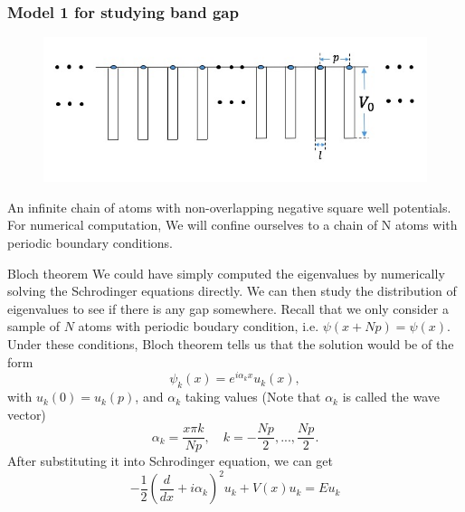 \documentclass{beamer}
\begin{document}

\begin{frame}
\frametitle{Model 1 for studying band gap}
\begin{figure}
\includegraphics[width=0.8\linewidth]{kp_bandgap.jpeg}
\end{figure}
An infinite chain of atoms with non-overlapping negative square well potentials. For numerical computation, We will confine ourselves to a chain of N atoms with periodic boundary conditions. 
\end{frame}

\begin{frame}{Bloch theorem}
    We could have simply computed the eigenvalues by numerically solving the Schrodinger equations directly. We can then study the distribution of eigenvalues to see if there is any gap somewhere. 
    Recall that we only consider a sample of $N$ atoms with periodic boudary condition, i.e. $\psi(x+Np) = \psi(x)$. 
    \newline
    Under these conditions, Bloch theorem tells us that the solution would be of the form $$\psi_k(x) = e^{i{\alpha_k}x}u_k(x),$$ 
    with $u_k(0) = u_k(p)$,
    and $\alpha_k$ taking values (Note that $\alpha_k$ is called the wave vector)
    $$\alpha_k = \frac{x\pi k}{Np}, \quad k = -\frac{Np}{2},...,\frac{Np}{2}. $$
    After substituting it into Schrodinger equation, we can get
\begin{equation}\label{eq:2.2bloch}
-\frac{1}{2}(\frac{d}{dx}+i\alpha_k)^2u_k+V(x)u_k = Eu_k
\end{equation}
    
\end{frame}
\end{document}
